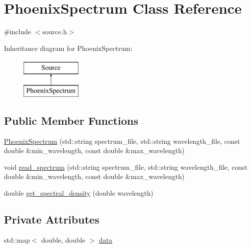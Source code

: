 \hypertarget{class_phoenix_spectrum}{}\section{Phoenix\+Spectrum Class Reference}
\label{class_phoenix_spectrum}


{\ttfamily \#include $<$source.\+h$>$}

Inheritance diagram for Phoenix\+Spectrum\+:\begin{figure}[H]
\begin{center}
\leavevmode
\includegraphics[height=2.000000cm]{class_phoenix_spectrum}
\end{center}
\end{figure}
\subsection*{Public Member Functions}
\begin{DoxyCompactItemize}
\item 
\hyperlink{class_phoenix_spectrum_a12bc8d55db0b852f04b03c4ea0f48884}{Phoenix\+Spectrum} (std\+::string spectrum\+\_\+file, std\+::string wavelength\+\_\+file, const double \&min\+\_\+wavelength, const double \&max\+\_\+wavelength)
\item 
void \hyperlink{class_phoenix_spectrum_a90e3cb19bdfaed4b5cd862bf00b64d2f}{read\+\_\+spectrum} (std\+::string spectrum\+\_\+file, std\+::string wavelength\+\_\+file, const double \&min\+\_\+wavelength, const double \&max\+\_\+wavelength)
\item 
double \hyperlink{class_phoenix_spectrum_a4e5ddcd25114f1a62a0f728165318fb1}{get\+\_\+spectral\+\_\+density} (double wavelength)
\end{DoxyCompactItemize}
\subsection*{Private Attributes}
\begin{DoxyCompactItemize}
\item 
std\+::map$<$ double, double $>$ \hyperlink{class_phoenix_spectrum_ac93c6be0579e2e0603dde85a24c189fe}{data}
\end{DoxyCompactItemize}


